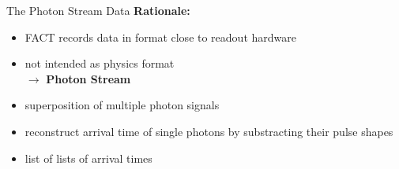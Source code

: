 \begin{frame}[t]{The Photon Stream Data}
    \large{\textbf{Rationale:}}
    \begin{itemize}
        \item FACT records data in format close to readout hardware
        \item not intended as physics format \\ $\rightarrow$ \textbf{Photon Stream}
        \item superposition of multiple photon signals
        \item reconstruct arrival time of single photons by substracting their pulse shapes
        \item list of lists of arrival times 
    \end{itemize}
\end{frame}

